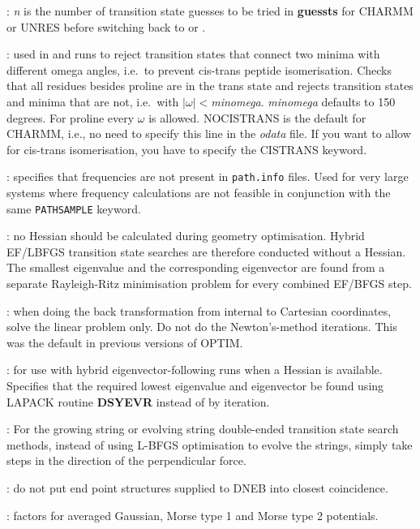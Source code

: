 {{{: {\it n\/} is the number of transition state guesses to be tried in 
{\bf guessts} for CHARMM or UNRES before switching back to  or .

: used in 
and  runs to reject transition states
that connect two minima with different omega angles, i.e.~to prevent cis-trans peptide
isomerisation. Checks that all residues besides proline are in the 
trans state and rejects transition states and minima that are not, 
i.e.~with $|\omega|<${\it minomega}. {\it minomega\/} defaults to 150 degrees. 
For proline every $\omega$ is allowed. NOCISTRANS is the default for
CHARMM, i.e., no need to specify this line in the {\it odata} file. If you
want to allow for cis-trans isomerisation, you have to specify the CISTRANS 
keyword.

: specifies that frequencies are not present in {\tt path.info} files.
Used for very large systems where frequency calculations are not feasible in conjunction
with the same {\tt PATHSAMPLE} keyword.

: no Hessian should be calculated during geometry optimisation.
Hybrid EF/LBFGS transition state searches are therefore conducted without a
Hessian. The smallest eigenvalue and the corresponding eigenvector are found from a separate
Rayleigh-Ritz minimisation problem for every combined EF/BFGS step.

: when doing the back transformation from internal to
  Cartesian coordinates, solve the linear problem only. Do not do the
  Newton's-method iterations. This was the default in previous versions of
  OPTIM.

: for use with hybrid eigenvector-following runs when a Hessian is available.
                    Specifies that the required lowest eigenvalue and eigenvector be found using
                    LAPACK routine {\bf DSYEVR} instead of by iteration.

: For the growing string or evolving string double-ended
  transition state search methods, instead of using L-BFGS optimisation to
  evolve the strings, simply take steps in the direction of the perpendicular force.

: do not put end point structures supplied to DNEB into 
closest coincidence.

: factors for averaged Gaussian, Morse type 1 and Morse
type 2 potentials.

}}}
